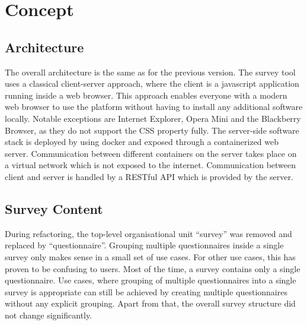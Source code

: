 \section{Concept}

\subsection{Architecture}
    The overall architecture is the same as for the previous version. The survey tool
    uses a classical client-server approach, where the client is a 
    javascript application running inside a web browser. This approach
    enables everyone with a modern web browser to use the platform without
    having to install any additional software locally. Notable exceptions
    are Internet Explorer, Opera Mini and the Blackberry Browser, as they
    do not support the CSS  property fully.
    The server-side software stack is deployed by using docker and 
    exposed through a containerized web server.
    Communication between different containers on the server takes place
    on a virtual network which is not exposed to the internet. Communication
    between client and server is handled by a RESTful API which is provided
    by the server.

\subsection{Survey Content}
    During refactoring, the top-level organisational unit ``survey'' was removed
    and replaced by ``questionnaire''. Grouping multiple questionnaires
    inside a single survey only makes sense in a small set of use cases.
    For other use cases, this has proven to be confusing to users. Most of the time, 
    a survey contains only a single questionnaire. Use cases, where
    grouping of multiple questionnaires into a single survey is appropriate
    can still be achieved by creating multiple questionnaires without any
    explicit grouping. Apart from that, the overall survey structure did not
    change significantly.

